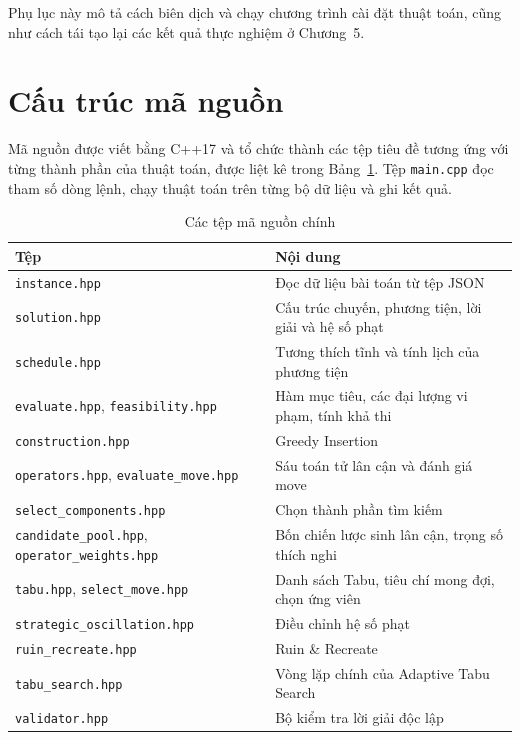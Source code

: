 \documentclass[../DoAn.tex]{subfiles}
\begin{document}
Phụ lục này mô tả cách biên dịch và chạy chương trình cài đặt thuật toán, cũng như cách tái tạo lại các kết quả thực nghiệm ở Chương~5.

\section{Cấu trúc mã nguồn}

Mã nguồn được viết bằng C++17 và tổ chức thành các tệp tiêu đề tương ứng với từng thành phần của thuật toán, được liệt kê trong Bảng~\ref{tab:src}. Tệp \texttt{main.cpp} đọc tham số dòng lệnh, chạy thuật toán trên từng bộ dữ liệu và ghi kết quả.

\begin{table}[H]
\centering
\caption{Các tệp mã nguồn chính}
\label{tab:src}
\begin{tabular}{ll}
\toprule
\textbf{Tệp} & \textbf{Nội dung} \\
\midrule
\texttt{instance.hpp} & Đọc dữ liệu bài toán từ tệp JSON \\
\texttt{solution.hpp} & Cấu trúc chuyến, phương tiện, lời giải và hệ số phạt \\
\texttt{schedule.hpp} & Tương thích tĩnh và tính lịch của phương tiện \\
\texttt{evaluate.hpp}, \texttt{feasibility.hpp} & Hàm mục tiêu, các đại lượng vi phạm, tính khả thi \\
\texttt{construction.hpp} & Greedy Insertion \\
\texttt{operators.hpp}, \texttt{evaluate\_move.hpp} & Sáu toán tử lân cận và đánh giá move \\
\texttt{select\_components.hpp} & Chọn thành phần tìm kiếm \\
\texttt{candidate\_pool.hpp}, \texttt{operator\_weights.hpp} & Bốn chiến lược sinh lân cận, trọng số thích nghi \\
\texttt{tabu.hpp}, \texttt{select\_move.hpp} & Danh sách Tabu, tiêu chí mong đợi, chọn ứng viên \\
\texttt{strategic\_oscillation.hpp} & Điều chỉnh hệ số phạt \\
\texttt{ruin\_recreate.hpp} & Ruin \& Recreate \\
\texttt{tabu\_search.hpp} & Vòng lặp chính của Adaptive Tabu Search \\
\texttt{validator.hpp} & Bộ kiểm tra lời giải độc lập \\
\bottomrule
\end{tabular}
\end{table}
\end{document}
